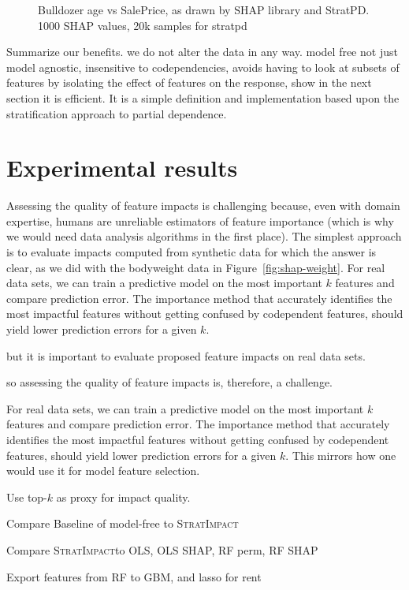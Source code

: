 \documentclass[11pt]{article}
\newcommand{\figref}[1]{Figure~\ref{#1}}
\newcommand{\simp}{\fontfamily{cmr}\textsc{\small StratImpact}}
\begin{document}
\begin{figure}[htbp]
\begin{center}
\caption{\small Bulldozer age vs SalePrice, as drawn by SHAP library and StratPD. 1000 SHAP values, 20k samples for stratpd}
\label{fig:shap-stratpd-YearMade}
\end{center}
\end{figure}

Summarize our benefits. we do not alter the data in any way. model free not just model agnostic, insensitive to codependencies, avoids having to look at subsets of features by isolating the effect of features on the response, show in the next section it is efficient. It is a simple definition and implementation based upon the stratification approach to partial dependence. 

\section{Experimental results}\label{sec:experiments}

Assessing the quality of feature impacts is challenging because, even with domain expertise, humans are unreliable estimators of feature importance (which is why we would need data analysis algorithms in the first place).  The simplest approach is to evaluate impacts computed from synthetic data for which the answer is clear, as we did with the bodyweight data in \figref{fig:shap-weight}.  For real data sets, we can train a predictive model on the most important $k$ features and compare prediction error. The importance method that accurately identifies the most impactful features without getting confused by codependent features, should yield lower prediction errors for a given $k$.

but it is important to evaluate proposed feature impacts on real data sets.

 so assessing the quality of feature impacts is, therefore, a challenge. 

For real data sets, we can train a predictive model on the most important $k$ features and compare prediction error. The importance method that accurately identifies the most impactful features without getting confused by codependent features, should yield lower prediction errors for a given $k$.   This mirrors how one would use it for model feature selection.

Use top-$k$ as proxy for impact quality.

Compare Baseline of model-free to \simp

Compare \simp to OLS, OLS SHAP, RF perm, RF SHAP

Export features from RF to GBM, and lasso for rent
\end{document}
